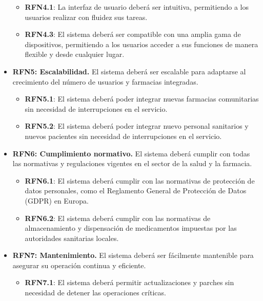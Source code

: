 \begin{itemize}
	\begin{itemize}
		\item \textbf{RFN4.1}: La interfaz de usuario deberá ser intuitiva, permitiendo a los usuarios realizar con fluidez sus tareas.
		\item \textbf{RFN4.3}: El sistema deberá ser compatible con una amplia gama de dispositivos, permitiendo a los usuarios acceder a sus funciones de manera flexible y desde cualquier lugar.
	\end{itemize}
	
	\item \textbf{RFN5: Escalabilidad.} El sistema deberá ser escalable para adaptarse al crecimiento del número de usuarios y farmacias integradas.
	
	\begin{itemize}
		\item \textbf{RFN5.1}: El sistema deberá poder integrar nuevas farmacias comunitarias sin necesidad de interrupciones en el servicio.
		\item \textbf{RFN5.2}: El sistema deberá poder integrar nuevo personal sanitarios y nuevos pacientes sin necesidad de interrupciones en el servicio.
	\end{itemize}
	
	\item \textbf{RFN6: Cumplimiento normativo.} El sistema deberá cumplir con todas las normativas y regulaciones vigentes en el sector de la salud y la farmacia.
	
	\begin{itemize}
		\item \textbf{RFN6.1}: El sistema deberá cumplir con las normativas de protección de datos personales, como el Reglamento General de Protección de Datos (GDPR) en Europa.
		\item \textbf{RFN6.2}: El sistema deberá cumplir con las normativas de almacenamiento y dispensación de medicamentos impuestas por las autoridades sanitarias locales.
	\end{itemize}
	
	\item \textbf{RFN7: Mantenimiento.} El sistema deberá ser fácilmente mantenible para asegurar su operación continua y eficiente.
	
	\begin{itemize}
		\item \textbf{RFN7.1}: El sistema deberá permitir actualizaciones y parches sin necesidad de detener las operaciones críticas.
	\end{itemize}
	
\end{itemize}


